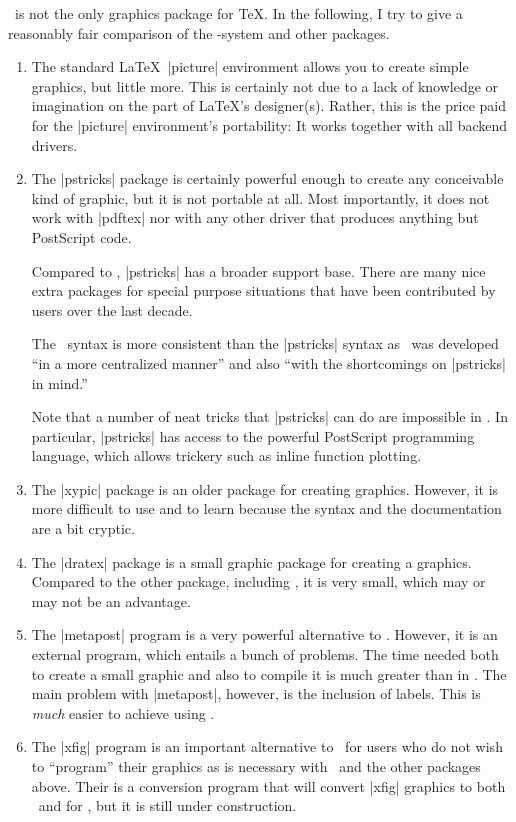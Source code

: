 \pgfname\ is not the only graphics package for \TeX. In the following,
I try to give a reasonably fair comparison of the \pgfname-system and
other packages.
\begin{enumerate}
\item
  The standard \LaTeX\ |{picture}| environment allows you to create
  simple graphics, but little more. This is certainly not
  due to a lack of knowledge or imagination on the part of
  \LaTeX's designer(s). Rather, this is the price paid for the
  |{picture}| environment's portability: It works together with all
  backend drivers.
\item
  The |pstricks| package is certainly powerful enough to create
  any conceivable kind of graphic, but it is not portable at all. Most
  importantly, it does not work with |pdftex| nor with any other
  driver that produces anything but PostScript code.

  Compared to \pgfname, |pstricks| has a broader support base. There
  are many nice extra packages for special purpose situations that have
  been contributed by users over the last decade.

  The \tikzname\ syntax is more consistent than the |pstricks| syntax
  as \tikzname\ was developed ``in a more centralized manner'' and
  also ``with the shortcomings on |pstricks| in mind.''

  Note that a number of neat tricks that |pstricks| can do are
  impossible in \pgfname. In particular, |pstricks| has access to the
  powerful PostScript programming language, which allows trickery
  such as inline function plotting.
\item
  The |xypic| package is an older package for creating
  graphics. However, it is more difficult to use and to learn because
  the syntax and the documentation are a bit cryptic.
\item
  The |dratex| package is a small graphic package for creating a
  graphics. Compared to the other package, including \pgfname, it is
  very small, which may or may not be an advantage.
\item
  The |metapost| program is a very powerful alternative to
  \pgfname. However, it is an external program, which entails a
  bunch of problems. The time needed both to create a small graphic
  and also to compile it is much greater than in \pgfname.
  The main problem with |metapost|, however, is the inclusion of
  labels. This is \emph{much} easier to achieve using \pgfname.
\item
  The |xfig| program is an important alternative to \tikzname\ for
  users who do not wish to ``program'' their graphics as is necessary
  with \tikzname\ and the other packages above. Their is a conversion
  program that will convert |xfig| graphics to both \tikzname\ and
  for \pgfname, but it is still under construction.
\end{enumerate}




